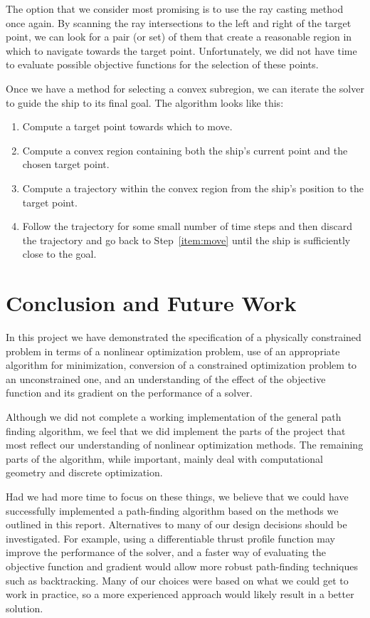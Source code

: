\documentclass{report}
\begin{document}
The option that we consider most promising is to use the ray casting method once again.
By scanning the ray intersections to the left and right of the target point, we can look for
a pair (or set) of them that create a reasonable region in which to navigate towards the target
point.
Unfortunately, we did not have time to evaluate possible objective functions for the selection
of these points.

Once we have a method for selecting a convex subregion, we can iterate the solver to guide the ship to
its final goal. The algorithm looks like this:
\begin{enumerate}
    \item \label{item:move} Compute a target point towards which to move.
    \item \label{item:region} Compute a convex region containing both the ship's current point and the chosen target
        point.
    \item \label{item:trajectory} Compute a trajectory within the convex region from the ship's position to the
        target point.
    \item \label{item:step} Follow the trajectory for some small number of time steps and then discard the trajectory and
        go back to Step~\ref{item:move} until the ship is sufficiently close to the goal. 
\end{enumerate}

\chapter*{Conclusion and Future Work}
In this project we have demonstrated the specification of a physically constrained
problem in terms of a nonlinear optimization problem, use of an appropriate algorithm for
minimization, conversion of a constrained optimization problem to an unconstrained one,
and an understanding of the effect of the objective function and its gradient on the
performance of a solver.

Although we did not complete a working implementation of the general path finding
algorithm, we feel that we did implement the parts of the project that most reflect
our understanding of nonlinear optimization methods. The remaining parts of the algorithm,
while important, mainly deal with computational geometry and discrete optimization.

Had we had more time to focus on these things, we believe that we could have successfully
implemented a path-finding algorithm based on the methods we outlined in this report.
Alternatives to many of our design decisions should be investigated. For example, using
a differentiable thrust profile function may improve the performance of the solver, and
a faster way of evaluating the objective function and gradient would allow
more robust path-finding techniques such as backtracking. Many of our choices were based
on what we could get to work in practice, so a more experienced approach would likely
result in a better solution.





\end{document}
